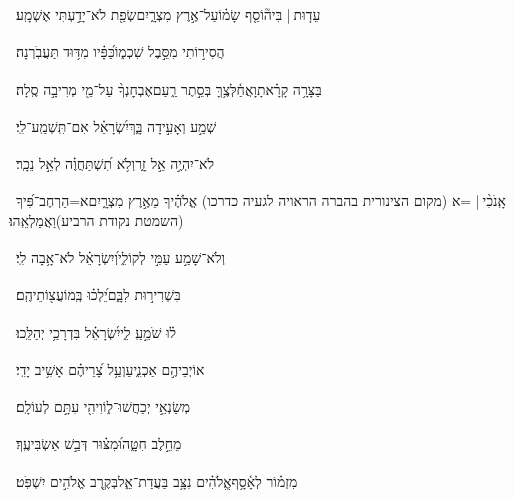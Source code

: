 \documentclass[12pt]{article}
\newcommand{\loc}[1]{\textsuperscript{\locf{#1}}}
\begin{document}
{\loc{ ו}~}‏עֵד֤וּת |  בִּיה֘וֹסֵ֤ף שָׂמ֗וֹ{\hfill}\newline\hspace*{.5em}עַל־אֶ֣רֶץ מִצְרָ֑יִם{\hfill}שְׂפַ֖ת לֹא־יָדַ֣עְתִּי אֶשְׁמָֽע׃\par

{\loc{ ז}~}‏הֲסִיר֣וֹתִי מִסֵּ֣בֶל שִׁכְמ֑וֹ{\hfill}כַּ֝פָּ֗יו מִדּ֥וּד תַּעֲבֹֽרְנָה׃\par

{\loc{ ח}~}‏בַּצָּרָ֥ה קָרָ֗אתָ{\hfill}וָאֲחַ֫לְּצֶ֥ךָּ\newline\hspace*{.5em} בְּסֵ֣תֶר רַ֑עַם{\hfill}אֶבְחׇנְךָ֨ עַל־מֵ֖י מְרִיבָ֣ה סֶֽלָה׃\par

{\loc{ ט}~}‏שְׁמַ֣ע  וְאָעִ֣ידָה בָּ֑ךְ{\hfill}יִ֝שְׂרָאֵ֗ל אִם־תִּֽשְׁמַֽע־לִֽי׃\par

{\loc{ י}~}‏לֹא־יִהְיֶ֣ה  אֵ֣ל זָ֑ר{\hfill}וְלֹ֥א תִ֝שְׁתַּחֲוֶ֗ה לְאֵ֣ל נֵכָֽר׃\par

{\loc{ יא}~}‏אָֽנֹכִ֨י |  =א (מקום הצינורית בהברה הראויה לגעיה כדרכו) אֱלֹהֶ֗יךָ{\hfill} מֵאֶ֣רֶץ מִצְרָ֑יִם\newline\hspace*{.5em}א=הַרְחֶב־פִּ֝יךָ (השמטת נקודת הרביע){\hfill}וַאֲמַלְאֵֽהוּ׃\par

{\loc{ יב}~}‏וְלֹא־שָׁמַ֣ע עַמִּ֣י לְקוֹלִ֑י{\hfill}וְ֝יִשְׂרָאֵ֗ל לֹא־אָ֥בָה לִֽי׃\par

{\loc{ יג}~}‏ בִּשְׁרִיר֣וּת לִבָּ֑ם{\hfill}יֵ֝לְכ֗וּ בְּֽמוֹעֲצ֖וֹתֵיהֶֽם׃\par

{\loc{ יד}~}‏ל֗וּ  שֹׁמֵ֣עַֽ לִ֑י{\hfill}יִ֝שְׂרָאֵ֗ל בִּדְרָכַ֥י יְהַלֵּֽכוּ׃\par

{\loc{ טו}~}‏ אוֹיְבֵיהֶ֣ם אַכְנִ֑יעַ{\hfill}וְעַ֥ל צָ֝רֵיהֶ֗ם אָשִׁ֥יב יָדִֽי׃\par

{\loc{ טז}~}‏מְשַׂנְאֵ֣י  יְכַחֲשׁוּ־ל֑וֹ{\hfill}וִיהִ֖י עִתָּ֣ם לְעוֹלָֽם׃\par

{\loc{ יז}~}‏ מֵחֵ֣לֶב חִטָּ֑ה{\hfill}וּ֝מִצּ֗וּר דְּבַ֣שׁ אַשְׂבִּיעֶֽךָ׃\par\pend
\ledpb
\pstart[\subsection*{\textcolor{red}{פרק פב}}]\label{פרק פב}
{\loc{ א}~}‏מִזְמ֗וֹר לְאָ֫סָ֥ף\newline\hspace*{.5em}אֱֽלֹהִ֗ים נִצָּ֥ב בַּעֲדַת־אֵ֑ל{\hfill}בְּקֶ֖רֶב אֱלֹהִ֣ים יִשְׁפֹּֽט׃\par
\end{document}
